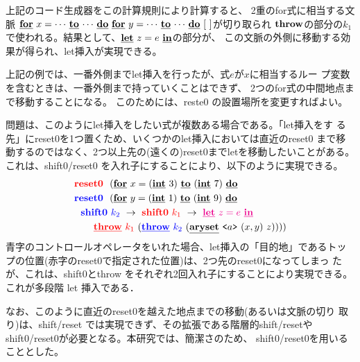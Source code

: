 上記のコード生成器をこの計算規則により計算すると、
2重のfor式に相当する文脈
$\cforin{x=\cdots}{\cdots}~\cforin{y=\cdots}{\cdots}~[~]$が切り取られ
$\Throw$の部分の$k_1$で使われる。結果として、$\cLet~z=e~\cIn$の部分が、
この文脈の外側に移動する効果が得られ、let挿入が実現できる。

上記の例では、一番外側までlet挿入を行ったが、式$e$が$x$に相当するルー
プ変数を含むときは、一番外側まで持っていくことはできず、
2つのfor式の中間地点まで移動することになる。
このためには、reste0 の設置場所を変更すればよい。

問題は、このようにlet挿入をしたい式が複数ある場合である。「let挿入をす
る先」にreset0を1つ置くため、いくつかのlet挿入においては直近のreset0
まで移動するのではなく、2つ以上先の(遠くの)reset0までletを移動したいことがある。
これは、shift0/reset0 を入れ子にすることにより、以下のように実現できる。
\begin{align*}
&\red{\Resetz} ~~(\cforin{x=(\cint~3)}{(\cint~7)} \\
&\blue{\Resetz} ~~(\cforin{y=(\cint~1)}{(\cint~9)} \\
&~~\blue{\Shiftz}~\blue{k_2}~\to~ \red{\Shiftz}~\red{k_1}~\to~ \magenta{\cLet~z=e~\cIn} \\
&~~~~~~
  \red{\cThrow}~\red{k_1}~(\blue{\cThrow}~\blue{k_2}~(\caryset{\code{a}}{(x,y)}{z}))))
\end{align*}
青字のコントロールオペレータをいれた場合、let挿入の「目的地」であるトッ
プの位置(赤字のreset0で指定された位置)は、2つ先のreset0になってしまっ
たが、これは、shift0とthrow をそれぞれ2回入れ子にすることにより実現できる。
これが多段階 let 挿入である．

なお、このように直近のreset0を越えた地点までの移動(あるいは文脈の切り
取り)は、shift/reset では実現できず、その拡張である階層的shift/resetや
shift0/reset0が必要となる。本研究では、簡潔さのため、
shift0/reset0を用いることとした。

